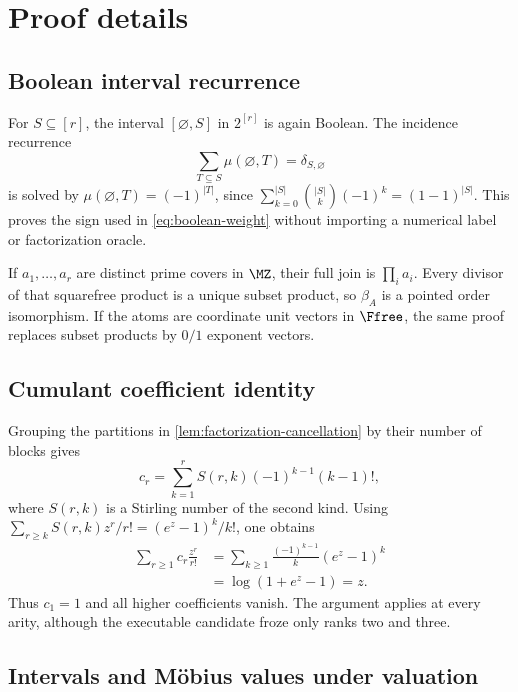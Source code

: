 \section{Proof details}
\label{app:proofs}

\subsection{Boolean interval recurrence}

For \(S\subseteq[r]\), the interval \([\varnothing,S]\) in \(2^{[r]}\) is
again Boolean.  The incidence recurrence
\begin{equation}
 \sum_{T\subseteq S}\mu(\varnothing,T)=\delta_{S,\varnothing}
 \label{eq:boolean-recurrence}
\end{equation}
is solved by \(\mu(\varnothing,T)=(-1)^{|T|}\), since
\(
 \sum_{k=0}^{|S|}\binom{|S|}{k}(-1)^k=(1-1)^{|S|}
\).
This proves the sign used in \eqref{eq:boolean-weight} without importing a
numerical label or factorization oracle.

If \(a_1,\ldots,a_r\) are distinct prime covers in \(\MZ\), their full join
is \(\prod_i a_i\).  Every divisor of that squarefree product is a unique
subset product, so \(\beta_A\) is a pointed order isomorphism.  If the atoms
are coordinate unit vectors in \(\Ffree\), the same proof replaces subset
products by \(0/1\) exponent vectors.

\subsection{Cumulant coefficient identity}

Grouping the partitions in \cref{lem:factorization-cancellation} by their
number of blocks gives
\begin{equation}
 c_r=\sum_{k=1}^r S(r,k)(-1)^{k-1}(k-1)!,
 \label{eq:stirling-cumulant}
\end{equation}
where \(S(r,k)\) is a Stirling number of the second kind.  Using
\(
 \sum_{r\ge k}S(r,k)z^r/r!=(e^z-1)^k/k!
\), one obtains
\begin{align}
 \sum_{r\ge1}c_r\frac{z^r}{r!}
 &=\sum_{k\ge1}\frac{(-1)^{k-1}}{k}(e^z-1)^k\\
 &=\log(1+e^z-1)=z.
 \label{eq:cumulant-egf}
\end{align}
Thus \(c_1=1\) and all higher coefficients vanish.  The argument applies at
every arity, although the executable candidate froze only ranks two and
three.

\subsection{Intervals and M{\"o}bius values under valuation}

